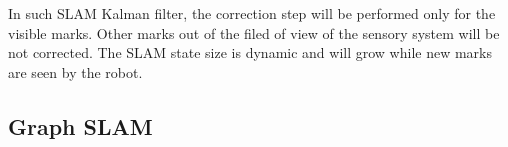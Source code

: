 In such SLAM Kalman filter, the correction step will be performed only for the visible marks. Other marks out of the filed of view of the sensory system will be not corrected. The SLAM state size is dynamic and will grow while new marks are seen by the robot. 









\subsection{Graph SLAM}



